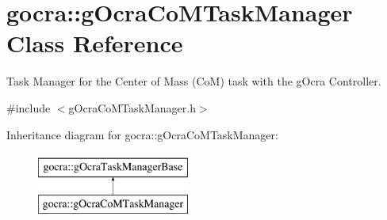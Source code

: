 \hypertarget{classgocra_1_1gOcraCoMTaskManager}{}\section{gocra\+:\+:g\+Ocra\+Co\+M\+Task\+Manager Class Reference}
\label{classgocra_1_1gOcraCoMTaskManager}


Task Manager for the Center of Mass (CoM) task with the g\+Ocra Controller.  




{\ttfamily \#include $<$g\+Ocra\+Co\+M\+Task\+Manager.\+h$>$}

Inheritance diagram for gocra\+:\+:g\+Ocra\+Co\+M\+Task\+Manager\+:\begin{figure}[H]
\begin{center}
\leavevmode
\includegraphics[height=2.000000cm]{de/de6/classgocra_1_1gOcraCoMTaskManager}
\end{center}
\end{figure}
